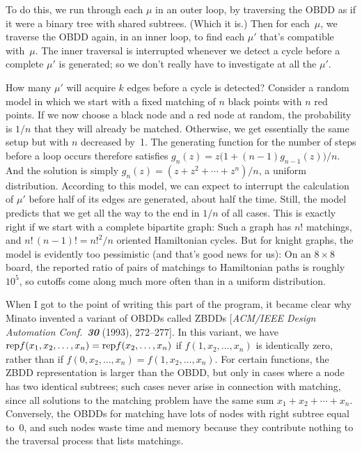 To do this, we run through each $\mu$ in an outer loop, by traversing the OBDD
as if it were a binary tree with shared subtrees. (Which it is.) Then for
each~$\mu$, we traverse the OBDD again, in an inner loop, to find each $\mu'$
that's compatible with~$\mu$. The inner traversal is interrupted whenever we
detect a cycle before a complete $\mu'$ is generated; so we don't really have
to investigate at all the $\mu'$.

How many $\mu'$ will acquire $k$ edges before a cycle is detected? Consider a
random model in which we start with a fixed matching of $n$ black points with
$n$ red points. If we now choose a black node and a red node at random, the
probability is $1/n$ that they will already be matched. Otherwise, we get
essentially the same setup but with $n$ decreased by~1. The generating
function for the number of steps before a loop occurs therefore satisfies
$g_n(z)=z\bigl(1+(n-1)g_{n-1}(z)\bigr)/n$. And the solution is simply
$g_n(z)=(z+z^2+\cdots+z^n)/n$, a uniform distribution. According to this
model, we can expect to interrupt the calculation of $\mu'$ before half of its
edges are generated, about half the time. Still, the model predicts that we
get all the way to the end in $1/n$ of all cases. This is exactly right if we
start with a complete bipartite graph: Such a graph has $n!$ matchings, and
$n!\,(n-1)!=n!^2/n$ oriented Hamiltonian cycles. But for knight graphs, the
model is evidently too pessimistic (and that's good news for us): On an
$8\times8$ board, the reported ratio of pairs of matchings to Hamiltonian
paths is roughly $10^5$, so cutoffs come along much more often than in a
uniform distribution.

\fi

When I got to the point of writing this part of the program, it became
clear
why Minato invented a variant of OBDDs called ZBDDs [{\sl ACM/IEEE Design
Automation Conf.\ \bf30} (1993), 272--277]. In this variant, we have
$\hbox{rep} f(x_1,x_2,\ldots,x_n)=\hbox{rep} f(x_2,\ldots,x_n)$ if $f(1,x_2,\ldots,x_n)$
is identically zero, rather than if $f(0,x_2,\ldots,x_n)=f(1,x_2,\ldots,x_n)$.
For certain functions, the ZBDD representation is larger than the OBDD,
but only in cases where a node has two identical subtrees; such cases never
arise in connection with matching, since all solutions to the matching problem
have the same sum $x_1+x_2+\cdots+x_n$. Conversely, the OBDDs for matching
have lots of nodes with right subtree equal to~0, and such nodes waste time
and memory because they contribute nothing to the traversal process that lists
matchings.


